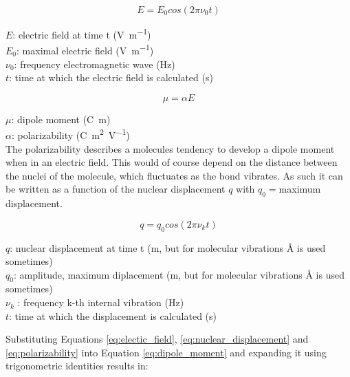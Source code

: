 \begin{equation} \label{eq:electic_field}
    E = E_0cos(2\pi\nu_0t)
\end{equation}

\(E\): electric field at time t (\unit{\volt\per\meter})\\
\(E_0\): maximal electric field (\unit{\volt\per\meter})\\
\(\nu_0\): frequency electromagnetic wave (\unit{\hertz}) \\
\(t\): time at which the electric field is calculated (\unit{\second})

\begin{equation} \label{eq:dipole_moment}
    \mu = \alpha E
\end{equation}

\(\mu\): dipole moment (\unit{\coulomb\meter}) \\
\(\alpha \): polarizability 
(\unit{\coulomb\meter\squared\per\volt})\\


The polarizability describes a molecules tendency to develop a dipole moment when in an electric field. This would of course depend on the distance between the nuclei of the molecule, which fluctuates as the bond vibrates. As such it can be written as a function of the nuclear displacement \(q\) with \(q_0=\)maximum displacement.

\begin{equation} \label{eq:nuclear_displacement}
   q=q_0cos(2\pi\nu_kt)
\end{equation}

\(q\): nuclear displacement at time t (\unit{\meter}, but for molecular vibrations \unit{\angstrom} is used sometimes)\\
\(q_0\): amplitude, maximum diplacement (\unit{\meter}, but for molecular vibrations \unit{\angstrom} is used sometimes)\\
\(\nu_k \) : frequency k-th internal vibration (\unit{\hertz}) \\
\(t\): time at which the displacement is calculated (\unit{\second})


\bigskip 

Substituting Equations \ref{eq:electic_field}, \ref{eq:nuclear_displacement} and \ref{eq:polarizability} into Equation \ref{eq:dipole_moment} and expanding it using trigonometric identities results in:

